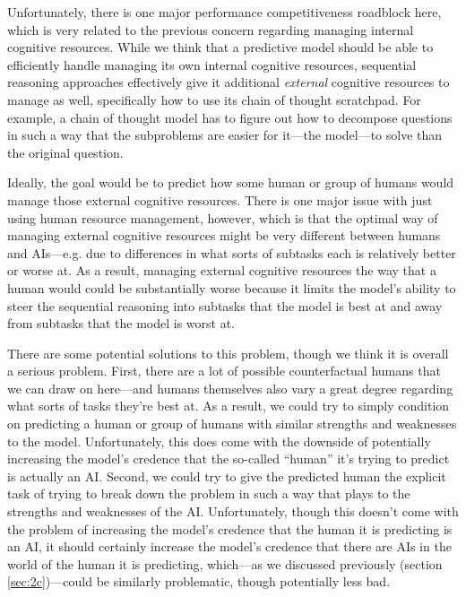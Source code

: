 \documentclass[
  onecolumn,
  natbib,
]{miri-tech-article}
\begin{document}
Unfortunately, there is one major performance competitiveness roadblock here, which is very related to the previous concern regarding managing internal cognitive resources. While we think that a predictive model should be able to efficiently handle managing its own internal cognitive resources, sequential reasoning approaches effectively give it additional \textit{external} cognitive resources to manage as well, specifically how to use its chain of thought scratchpad. For example, a chain of thought model has to figure out how to decompose questions in such a way that the subproblems are easier for it---the model---to solve than the original question.

Ideally, the goal would be to predict how some human or group of humans would manage those external cognitive resources. There is one major issue with just using human resource management, however, which is that the optimal way of managing external cognitive resources might be very different between humans and AIs---e.g. due to differences in what sorts of subtasks each is relatively better or worse at. As a result, managing external cognitive resources the way that a human would could be substantially worse because it limits the model's ability to steer the sequential reasoning into subtasks that the model is best at and away from subtasks that the model is worst at.

There are some potential solutions to this problem, though we think it is overall a serious problem. First, there are a lot of possible counterfactual humans that we can draw on here---and humans themselves also vary a great degree regarding what sorts of tasks they're best at. As a result, we could try to simply condition on predicting a human or group of humans with similar strengths and weaknesses to the model. Unfortunately, this does come with the downside of potentially increasing the model's credence that the so-called ``human'' it's trying to predict is actually an AI. Second, we could try to give the predicted human the explicit task of trying to break down the problem in such a way that plays to the strengths and weaknesses of the AI. Unfortunately, though this doesn't come with the problem of increasing the model's credence that the human it is predicting is an AI, it should certainly increase the model's credence that there are AIs in the world of the human it is predicting, which---as we discussed previously (section \ref{sec:2c})---could be similarly problematic, though potentially less bad.
\end{document}
